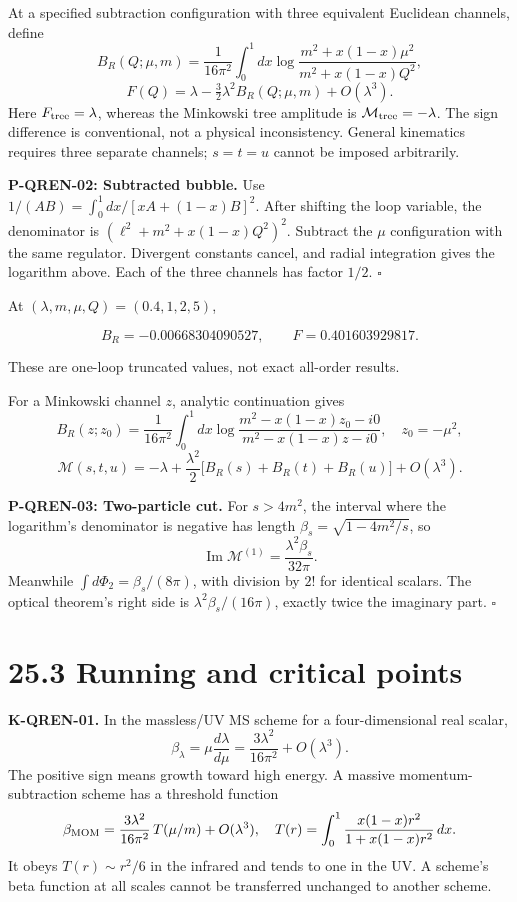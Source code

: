 \documentclass[
  11pt,
  oneside]{book}
\begin{document}
At a specified subtraction configuration with three equivalent Euclidean
channels, define \[
B_R(Q;\mu,m)=\frac1{16\pi^2}\int_0^1dx
\log\frac{m^2+x(1-x)\mu^2}{m^2+x(1-x)Q^2},
\] \[
F(Q)=\lambda-\tfrac32\lambda^2 B_R(Q;\mu,m)+O(\lambda^3).
\] Here \(F_{\rm tree}=\lambda\), whereas the Minkowski tree amplitude
is \(\mathcal M_{\rm tree}=-\lambda\). The sign difference is
conventional, not a physical inconsistency. General kinematics requires
three separate channels; \(s=t=u\) cannot be imposed arbitrarily.

\label{p-qren-02}{}

\textbf{P-QREN-02: Subtracted bubble.} Use
\(1/(AB)=\int_0^1dx/[xA+(1-x)B]^2\). After shifting the loop variable,
the denominator is \((\ell^2+m^2+x(1-x)Q^2)^2\). Subtract the \(\mu\)
configuration with the same regulator. Divergent constants cancel, and
radial integration gives the logarithm above. Each of the three channels
has factor \(1/2\). \(\square\)

At \((\lambda,m,\mu,Q)=(0.4,1,2,5)\),

\[
B_R=-0.00668304090527,\qquad F=0.401603929817.
\]

These are one-loop truncated values, not exact all-order results.

For a Minkowski channel \(z\), analytic continuation gives \[
B_R(z;z_0)=\frac1{16\pi^2}\int_0^1dx
\log\frac{m^2-x(1-x)z_0-i0}{m^2-x(1-x)z-i0},
\quad z_0=-\mu^2,
\] \[
\mathcal M(s,t,u)=-\lambda+
\frac{\lambda^2}{2}\bigl[B_R(s)+B_R(t)+B_R(u)\bigr]+O(\lambda^3).
\] \label{p-qren-03}{}

\textbf{P-QREN-03: Two-particle cut.} For \(s>4m^2\), the interval where
the logarithm's denominator is negative has length
\(\beta_s=\sqrt{1-4m^2/s}\), so \[
\operatorname{Im}\mathcal M^{(1)}=\frac{\lambda^2\beta_s}{32\pi}.
\] Meanwhile \(\int d\Phi_2=\beta_s/(8\pi)\), with division by \(2!\)
for identical scalars. The optical theorem's right side is
\(\lambda^2\beta_s/(16\pi)\), exactly twice the imaginary part.
\(\square\)

\section{25.3 Running and critical points}

\textbf{K-QREN-01.} In the massless/UV MS scheme for a four-dimensional
real scalar, \[
\beta_\lambda=\mu\frac{d\lambda}{d\mu}
=\frac{3\lambda^2}{16\pi^2}+O(\lambda^3).
\] The positive sign means growth toward high energy. A massive
momentum-subtraction scheme has a threshold function \[
\beta_{\rm MOM}=\frac{3\lambda^2}{16\pi^2}\,
T(\mu/m)+O(\lambda^3),\quad
T(r)=\int_0^1\frac{x(1-x)r^2}{1+x(1-x)r^2}\,dx.
\] It obeys \(T(r)\sim r^2/6\) in the infrared and tends to one in the
UV. A scheme's beta function at all scales cannot be transferred
unchanged to another scheme.
\end{document}
